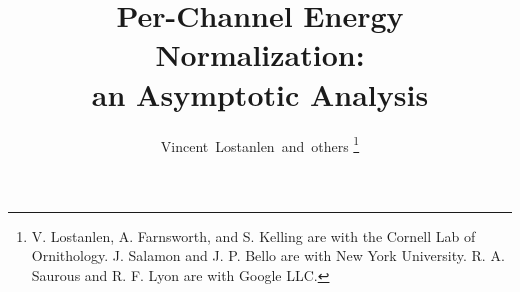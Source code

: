 \documentclass[journal]{IEEEtran}
\begin{document}
%
\title{Per-Channel Energy Normalization: \\
an Asymptotic Analysis}
%
%
%


\author{Vincent~Lostanlen~and~others%
\thanks{V. Lostanlen, A. Farnsworth, and S. Kelling are with the Cornell Lab of Ornithology.
J. Salamon and J. P. Bello are with New York University.
R. A. Saurous and R. F. Lyon are with Google LLC.}%
}

% 
%
\end{document}
